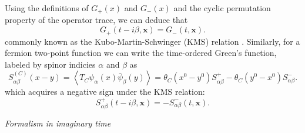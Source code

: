 Using the definitions of $G_{+}(x)$ and $G_{-}(x)$ and the cyclic permutation property of the operator trace, we can deduce that
\begin{equation}
G_{+}(t-i\beta,\textbf{x}) = G_{-}(t,\textbf{x}).
\label{eqn:KMS}
\end{equation}
commonly known as the Kubo-Martin-Schwinger (KMS) relation \cite{RN726,RN725}. Similarly, for a fermion two-point function we can write the time-ordered Green's function, labeled by spinor indicies $\alpha$ and $\beta$ as
\begin{equation}
S^{(C)}_{\alpha \beta}(x-y)=\left \langle T_C \psi_{\alpha}(x) \bar{\psi}_{\beta}(y) \right \rangle = \theta_{C}(x^0-y^0)S^+_{\alpha \beta} - \theta_{C}(y^0-x^0)S^{-}_{\alpha \beta}.
\end{equation}
which acquires a negative sign under the KMS relation:
\begin{equation}
S^{+}_{\alpha \beta}(t-i\beta,\textbf{x})=-S^{-}_{\alpha \beta}(t,\textbf{x}).
\label{eqn:KMSferm}
\end{equation}

\noindent \textit{Formalism in imaginary time}

